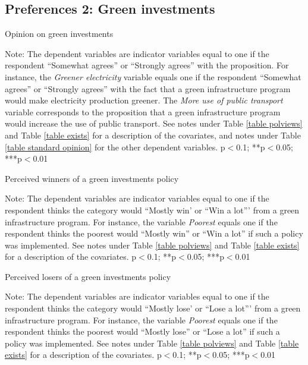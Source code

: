 \documentclass{article}
\begin{document}
\clearpage
\subsection{Preferences 2: Green investments}



\begin{table}[h!]
	\caption{Opinion on green investments}
	\begin{center}
		\scalebox{0.7}{}
	\end{center}
	{\footnotesize Note: The dependent variables are indicator variables equal to one if the respondent ``Somewhat agrees'' or ``Strongly agrees'' with the proposition. For instance, the \textit{Greener electricity} variable equals one if the respondent ``Somewhat agrees'' or ``Strongly agrees'' with the fact that a green infrastructure program would make electricity production greener. The \textit{More use of public transport} variable corresponds to the proposition that a green infrastructure program would increase the use of public transport. See notes under Table \ref{table polviews} and Table \ref{table exists} for a description of the covariates, and notes under Table \ref{table standard opinion} for the other dependent variables.
	\newline *p$<$0.1; **p$<$0.05; ***p$<$0.01}
\end{table}	

\begin{table}[h!]
	\caption{Perceived winners of a green investments policy}
	\begin{center}
		\scalebox{0.7}{}
	\end{center}
	{\footnotesize Note: The dependent variables are indicator variables equal to one if the respondent thinks the category would ``Mostly win' or ``Win a lot''' from a green infrastructure program. For instance, the variable \textit{Poorest} equals one if the respondent thinks the poorest would ``Mostly win'' or ``Win a lot'' if such a policy was implemented. See notes under Table \ref{table polviews} and Table \ref{table exists} for a description of the covariates.
	\newline *p$<$0.1; **p$<$0.05; ***p$<$0.01}
\end{table}	

\begin{table}[h!]
	\caption{Perceived losers of a green investments policy}
	\begin{center}
		\scalebox{0.7}{}
	\end{center}
	{\footnotesize Note: The dependent variables are indicator variables equal to one if the respondent thinks the category would ``Mostly lose' or ``Lose a lot''' from a green infrastructure program. For instance, the variable \textit{Poorest} equals one if the respondent thinks the poorest would ``Mostly lose'' or ``Lose a lot'' if such a policy was implemented. See notes under Table \ref{table polviews} and Table \ref{table exists} for a description of the covariates.
	\newline *p$<$0.1; **p$<$0.05; ***p$<$0.01}
\end{table}	
\end{document}
